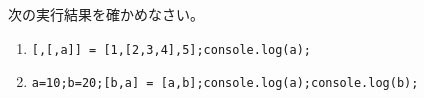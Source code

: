 \begin{Prob}\upshape
 次の実行結果を確かめなさい。
 \begin{enumerate}
  \item \Verb+[,[,a]] = [1,[2,3,4],5];console.log(a);+
  \item \Verb+a=10;b=20;[b,a] = [a,b];console.log(a);console.log(b);+
 \end{enumerate}
\end{Prob}